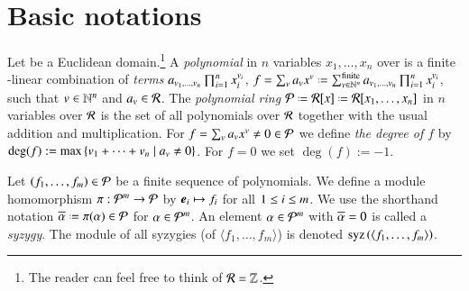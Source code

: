 \section{Basic notations}
\label{sec:notation}
Let \er be a Euclidean domain.\footnote{The reader can
    feel free to think of $\mathcal{R} = \mathbb{Z}$.}
A \emph{polynomial}
in $n$ variables $x_1,\ldots,x_n$ over \er is a finite \er-linear
combination of \emph{terms} $a_{v_1,\ldots,v_n} \prod_{i=1}^n
x_i^{v_i}$,
$f=\sum_{v}\const_v x^v \defeq
\sum_{v\in\N^n}^{\text{finite}}\const_{v_1,\ldots,v_n} \prod_{i=1}^n
x_i^{v_i}$,
such that $v \in \mathbb{N}^n$ and $a_v \in \mathcal{R}$.
The \emph{polynomial ring} $\epr \defeq \er[x] \defeq \er[x_1,\ldots,x_n]$
in $n$ variables over $\mathcal{R}$ is the set of all polynomials over $\mathcal{R}$
together with the usual addition and multiplication. For $f=\sum_{v}a_v
x^v \neq 0 \in\mathcal{P}$ we define \emph{the degree of $f$} by $\deg(f) :=
\max\left\{v_1+\cdots +v_n \mid a_v \neq 0\right\}$. For $f=0$ we set
$\deg(f):=
-1$.
%

Let $\left({f}_1,\ldots,{f}_m\right) \in \mathcal{P}$ be a finite sequence of polynomials. We define a module
homomorphism $\pi : \mathcal{P}^m \rightarrow \mathcal{P}$ by $\boldsymbol{e}_{i} \mapsto f_i$ for
all $1\leq i \leq m$. We use the shorthand notation $\proj\alpha
\defeq \pi(\alpha) \in \epr$ for $\alpha \in \mathcal{P}^m$. An element $\alpha \in
\mathcal{P}^m$ with $\overline{\alpha} = 0$ is called a \emph{syzygy}. The module of all
syzygies (of $\langle f_1,\ldots, f_m\rangle$) is denoted $\mathrm{syz}\left({\langle
  f_1,\ldots, f_m\rangle}\right)$.

